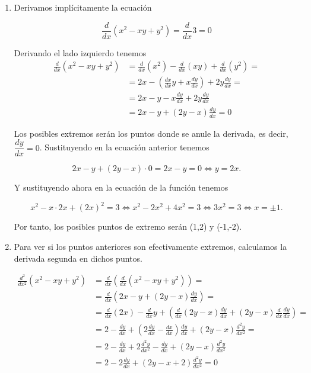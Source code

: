 \documentclass[
  spanish,
  a4paper,
]{scrreport}
\theoremstyle{definition}
\theoremstyle{remark}
\begin{document}
\begin{tcolorbox}[enhanced jigsaw, arc=.35mm, bottomrule=.15mm, bottomtitle=1mm, breakable, colback=white, colbacktitle=quarto-callout-tip-color!10!white, colframe=quarto-callout-tip-color-frame, coltitle=black, left=2mm, leftrule=.75mm, opacityback=0, opacitybacktitle=0.6, rightrule=.15mm, title=\textcolor{quarto-callout-tip-color}{\faLightbulb}\hspace{0.5em}{Solución}, titlerule=0mm, toprule=.15mm, toptitle=1mm]

\begin{enumerate}
\def\labelenumi{\alph{enumi}.}
\item
  Derivamos implícitamente la ecuación

  \[
   \frac{d}{dx}(x^2-xy+y^2)=\frac{d}{dx}3=0
   \]

  Derivando el lado izquierdo tenemos \begin{align*}
   \frac{d}{dx}(x^2-xy+y^2) &=
   \frac{d}{dx}(x^2)-\frac{d}{dx}(xy)+\frac{d}{dx}(y^2)=\\ 
   &= 2x-(\frac{dx}{dx}y+x\frac{dy}{dx})+2y\frac{dy}{dx}=\\
   &= 2x-y-x\frac{dy}{dx}+2y\frac{dy}{dx}\\ 
   &= 2x-y+(2y-x)\frac{dy}{dx}=0
   \end{align*}

  Los posibles extremos serán los puntos donde se anule la derivada, es
  decir, \(\dfrac{dy}{dx}=0\). Sustituyendo en la ecuación anterior
  tenemos

  \[
   2x-y+(2y-x)\cdot 0= 2x-y=0 \Leftrightarrow y=2x.
   \]

  Y sustituyendo ahora en la ecuación de la función tenemos

  \[
   x^2-x\cdot 2x+(2x)^2=3 \Leftrightarrow x^2-2x^2+4x^2=3 \Leftrightarrow 3x^2=3 \Leftrightarrow x=\pm1.
   \]

  Por tanto, los posibles puntos de extremo serán (1,2) y (-1,-2).
\item
  Para ver si los puntos anteriores son efectivamente extremos,
  calculamos la derivada segunda en dichos puntos.

  \begin{align*}
   \frac{d^2}{dx^2}(x^2-xy+y^2)&=
   \frac{d}{dx}\left(\frac{d}{dx}(x^2-xy+y^2)\right)=\\
   &=\frac{d}{dx}\left(2x-y+(2y-x)\frac{dy}{dx}\right)=\\
   &=\frac{d}{dx}(2x)-\frac{d}{dx}y+\left(\frac{d}{dx}(2y-x)\frac{dy}{dx}+(2y-x)\frac{d}{dx}\frac{dy}{dx}\right)=\\
   &=2-\frac{dy}{dx}+\left(2\frac{dy}{dx}-\frac{dx}{dx}\right)\frac{dy}{dx}+(2y-x)\frac{d^2y}{dx^2}=\\
   &= 2-\frac{dy}{dx}+2\frac{d^2y}{dx^2}-\frac{dy}{dx}+(2y-x)\frac{d^2y}{dx^2}\\ 
   &= 2-2\frac{dy}{dx}+(2y-x+2)\frac{d^2y}{dx^2}=0
   \end{align*}


\end{enumerate}
\end{tcolorbox}
\end{document}
